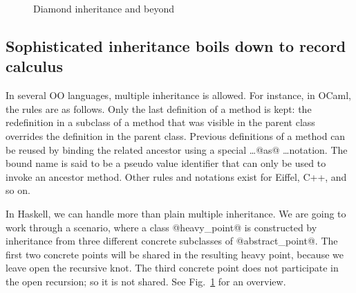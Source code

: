 \begin{figure}[t]
\begin{center}
\end{center}
\vspace{-33\in}
\caption{Diamond inheritance and beyond}
\label{F:heavy}
\end{figure}






\subsection{Sophisticated inheritance boils down to record calculus}

In several OO languages, multiple inheritance is allowed. For
instance, in OCaml, the rules are as follows. Only the last definition
of a method is kept: the redefinition in a subclass of a method that
was visible in the parent class overrides the definition in the parent
class. Previous definitions of a method can be reused by binding the
related ancestor using a special \ldots @as@ \ldots notation.  The
bound name is said to be a pseudo value identifier that can only be
used to invoke an ancestor method. Other rules and notations exist for
Eiffel, C++, and so on.

In Haskell, we can handle more than plain multiple inheritance.
We are going to work through a scenario, where a class @heavy_point@
is constructed by inheritance from three different concrete subclasses
of @abstract_point@. The first two
concrete points will be shared in the resulting heavy point, because
we leave open the recursive knot. The third concrete point
does not participate in the open recursion; so it is not shared. See
Fig.~\ref{F:heavy} for an overview.

